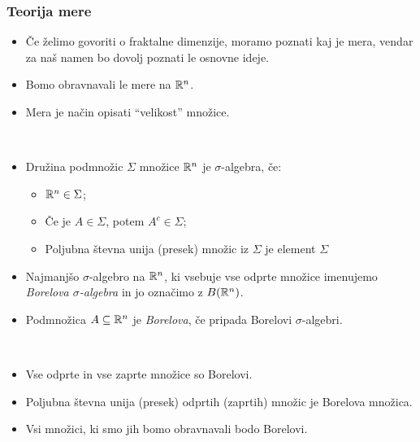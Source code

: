 \subsubsection*{Teorija mere}
\begin{itemize}
    \item Če želimo govoriti o fraktalne dimenzije, moramo poznati kaj je mera, vendar za naš namen bo dovolj poznati le osnovne ideje.
    \item Bomo obravnavali le mere na \(\mathbb{R}^n\).
    \item Mera je način opisati "`velikost"' množice.
\end{itemize}
\begin{definicija} \ 
    \begin{itemize}
        \item Družina podmnožic \(\Sigma\) množice \(\mathbb{R}^n\) je \(\sigma\)-algebra, če:
        \begin{itemize}
            \item \(\mathbb{R}^n \in \Sigma\);
            \item Če je \(A \in \Sigma\), potem \(A^c \in \Sigma\);
            \item Poljubna števna unija (presek) množic iz \(\Sigma\) je element \(\Sigma\)
        \end{itemize}
        \item Najmanjšo \(\sigma\)-algebro na \(\mathbb{R}^n\), ki vsebuje vse odprte množice imenujemo \emph{Borelova \(\sigma\)-algebra} in jo označimo z \(B(\mathbb{R}^n)\).
        \item Podmnožica \(A \subseteq \mathbb{R}^n\) je \emph{Borelova}, če pripada Borelovi \(\sigma\)-algebri.
    \end{itemize}
\end{definicija}

\begin{opomba} \ 
    \begin{itemize}
        \item Vse odprte in vse zaprte množice so Borelovi.
        \item Poljubna števna unija (presek) odprtih (zaprtih) množic je Borelova množica. 
        \item Vsi množici, ki smo jih bomo obravnavali bodo Borelovi.
    \end{itemize}
\end{opomba}

